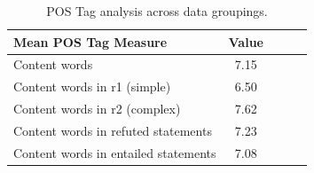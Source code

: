 \begin{table}[ht]
\center
\begin{tabular}{lcccc}
\hline
Mean POS Tag Measure & Value\\
\hline
Content words & 7.15\\
Content words in r1 (simple) & 6.50\\
Content words in r2 (complex) & 7.62\\
Content words in refuted statements & 7.23\\
Content words in entailed statements & 7.08\\
\hline
\end{tabular}
\caption{POS Tag analysis across data groupings.}
\label{tab:tabfact_pos_tag_analysis}
\end{table}